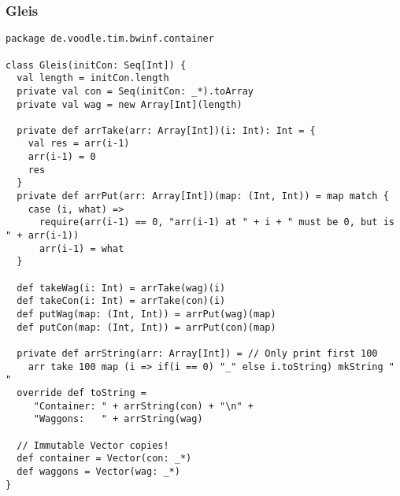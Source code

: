 \subsubsection{Gleis}
\begin{lstlisting}
package de.voodle.tim.bwinf.container

class Gleis(initCon: Seq[Int]) {
  val length = initCon.length
  private val con = Seq(initCon: _*).toArray
  private val wag = new Array[Int](length)

  private def arrTake(arr: Array[Int])(i: Int): Int = {
    val res = arr(i-1)
    arr(i-1) = 0
    res
  }
  private def arrPut(arr: Array[Int])(map: (Int, Int)) = map match {
    case (i, what) =>
      require(arr(i-1) == 0, "arr(i-1) at " + i + " must be 0, but is " + arr(i-1))
      arr(i-1) = what
  }

  def takeWag(i: Int) = arrTake(wag)(i)
  def takeCon(i: Int) = arrTake(con)(i)
  def putWag(map: (Int, Int)) = arrPut(wag)(map)
  def putCon(map: (Int, Int)) = arrPut(con)(map)

  private def arrString(arr: Array[Int]) = // Only print first 100
    arr take 100 map (i => if(i == 0) "_" else i.toString) mkString " "
  override def toString =
     "Container: " + arrString(con) + "\n" +
     "Waggons:   " + arrString(wag)

  // Immutable Vector copies!
  def container = Vector(con: _*)
  def waggons = Vector(wag: _*)
}
\end{lstlisting}
\newpage
